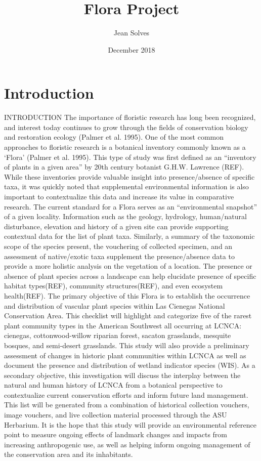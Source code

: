 \documentclass{article}
\title{Flora Project}
\author{Jean Solves}
\date{December 2018}
\begin{document}
\maketitle

\section{Introduction}
INTRODUCTION
The importance of floristic research has long been recognized, and interest today continues to grow through the fields of conservation biology and restoration ecology (Palmer et al. 1995).  One of the most common approaches to floristic research is a botanical inventory commonly known as a ‘Flora’ (Palmer et al. 1995). This type of study was first defined as an “inventory of plants in a given area” by 20th century botanist G.H.W. Lawrence (REF). While these inventories provide valuable insight into presence/absence of specific taxa, it was quickly noted that supplemental environmental information is also important to contextualize this data and increase its value in comparative research. The current standard for a Flora serves as an “environmental snapshot” of a given locality. Information such as the geology, hydrology, human/natural disturbance, elevation and history of a given site can provide supporting contextual data for the list of plant taxa. Similarly, a summary of the taxonomic scope of the species present, the vouchering of collected specimen, and an assessment of native/exotic taxa supplement the presence/absence data to provide a more holistic analysis on the vegetation of a location. The presence or absence of plant species across a landscape can help elucidate presence of specific habitat types(REF), community structures(REF), and even ecosystem health(REF). 
The primary objective of this Flora is to establish the occurrence and distribution of vascular plant species within Las Cienegas National Conservation Area. This checklist will highlight and categorize five of the rarest plant community types in the American Southwest all occurring at LCNCA: cienegas, cottonwood-willow riparian forest, sacaton grasslands, mesquite bosques, and semi-desert grasslands. This study will also provide a preliminary assessment of changes in historic plant communities within LCNCA as well as document the presence and distribution of wetland indicator species (WIS). As a secondary objective, this investigation will discuss the interplay between the natural and human history of LCNCA from a botanical perspective to contextualize current conservation efforts and inform future land management. This list will be generated from a combination of historical collection vouchers, image vouchers, and live collection material processed through the ASU Herbarium. It is the hope that this study will provide an environmental reference point to measure ongoing effects of landmark changes and impacts from increasing anthropogenic use, as well as helping inform ongoing management of the conservation area and its inhabitants.
\end{document}
